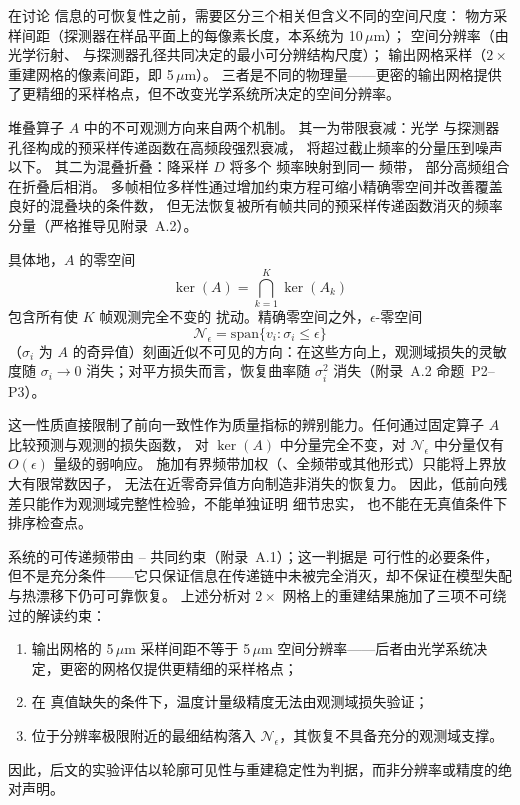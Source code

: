 在讨论  信息的可恢复性之前，需要区分三个相关但含义不同的空间尺度：
物方采样间距（探测器在样品平面上的每像素长度，本系统为 10\,\(\mu\)m）；
空间分辨率（由光学衍射、 与探测器孔径共同决定的最小可分辨结构尺度）；
输出网格采样（\(2\times\) 重建网格的像素间距，即 5\,\(\mu\)m）。
三者是不同的物理量——更密的输出网格提供了更精细的采样格点，但不改变光学系统所决定的空间分辨率。

堆叠算子 \(A\) 中的不可观测方向来自两个机制。
其一为带限衰减：光学  与探测器孔径构成的预采样传递函数在高频段强烈衰减，
将超过截止频率的分量压到噪声以下。
其二为混叠折叠：降采样 \(D\) 将多个  频率映射到同一  频带，
部分高频组合在折叠后相消。
多帧相位多样性通过增加约束方程可缩小精确零空间并改善覆盖良好的混叠块的条件数，
但无法恢复被所有帧共同的预采样传递函数消灭的频率分量（严格推导见附录~A.2）。

具体地，\(A\) 的零空间
\begin{equation}
  \ker(A) = \bigcap_{k=1}^K \ker(A_k)
\end{equation}
包含所有使 \(K\) 帧观测完全不变的  扰动。精确零空间之外，\(\epsilon\)-零空间
\begin{equation}
  \mathcal{N}_\epsilon = \mathrm{span}\{v_i:\sigma_i \le \epsilon\}
\end{equation}
（\(\sigma_i\) 为 \(A\) 的奇异值）刻画近似不可见的方向：在这些方向上，观测域损失的灵敏度随
\(\sigma_i \to 0\) 消失；对平方损失而言，恢复曲率随 \(\sigma_i^2\) 消失（附录~A.2 命题~P2--P3）。

这一性质直接限制了前向一致性作为质量指标的辨别能力。任何通过固定算子 \(A\) 比较预测与观测的损失函数，
对 \(\ker(A)\) 中分量完全不变，对 \(\mathcal{N}_\epsilon\) 中分量仅有 \(O(\epsilon)\) 量级的弱响应。
施加有界频带加权（、全频带或其他形式）只能将上界放大有限常数因子，
无法在近零奇异值方向制造非消失的恢复力。
因此，低前向残差只能作为观测域完整性检验，不能单独证明  细节忠实，
也不能在无真值条件下排序检查点。

系统的可传递频带由 -- 共同约束（附录~A.1）；这一判据是  可行性的必要条件，
但不是充分条件——它只保证信息在传递链中未被完全消灭，却不保证在模型失配与热漂移下仍可可靠恢复。
上述分析对 \(2\times\) 网格上的重建结果施加了三项不可绕过的解读约束：
\begin{enumerate}
  \item 输出网格的 5\,\(\mu\)m 采样间距不等于 5\,\(\mu\)m 空间分辨率——后者由光学系统决定，更密的网格仅提供更精细的采样格点；
  \item 在  真值缺失的条件下，温度计量级精度无法由观测域损失验证；
  \item 位于分辨率极限附近的最细结构落入 \(\mathcal{N}_\epsilon\)，其恢复不具备充分的观测域支撑。
\end{enumerate}
因此，后文的实验评估以轮廓可见性与重建稳定性为判据，而非分辨率或精度的绝对声明。


